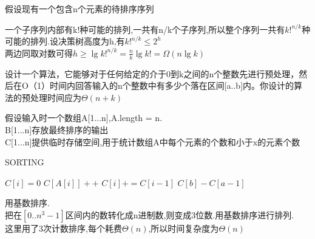 \documentclass[a4paper, justified]{tufte-handout}
\begin{document}
\begin{problem}[TC 8.1-4]
假设现有一个包含n个元素的待排序序列
\end{problem}

\begin{solution}
  一个子序列内部有k!种可能的排列,一共有n/k个子序列,所以整个序列一共有$k!^{n/k}$种可能的排列.设决策树高度为h,有$k!^{n/k} \leq 2^h$\\
  两边同取对数可得$h \geq \lg k!^{n/k} = \frac{n}{k} \lg k! =\Omega (n\lg k)$
\end{solution}

\begin{problem}[TC 8.2-4]
设计一个算法，它能够对于任何给定的介于0到k之间的n个整数先进行预处理，然后在O（1）时间内回答输入的n个整数中有多少个落在区间[a..b]内。你设计的算法的预处理时间应为$\Theta (n+k)$
\end{problem}

\begin{solution}
  假设输入时一个数组A[1...n],A.length = n.\\
  B[1...n]存放最终排序的输出\\
  C[1...n]提供临时存储空间,用于统计数组A中每个元素的个数和小于x的元素个数\\
  \begin{algorithm}[H]
    \caption{SORTING}
    \label{counting_sorting}
    \begin{algorithmic}[1]
      \State $C[i] = 0$
      \EndFor
      \State $C[A[i]]++$
      \EndFor
      \State $C[i] += C[i - 1]$
      \EndFor
      \State \Return $C[b] - C[a - 1]$
      \EndFunction
    \end{algorithmic}
  \end{algorithm}
\end{solution}

\begin{problem}[TC 8.3-4]
\end{problem}

\begin{solution}
  用基数排序.\\
  把在$[0..n^3-1]$区间内的数转化成n进制数,则变成3位数.用基数排序进行排列.\\
  这里用了3次计数排序,每个耗费$\Theta (n)$,所以时间复杂度为$\Theta (n)$
\end{solution}
\end{document}
